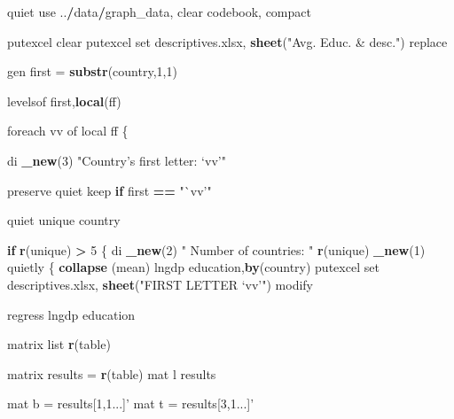 \documentclass[
  12pt,
]{article}
\newenvironment{Shaded}{\begin{snugshade}}{\end{snugshade}}
\newcommand{\ControlFlowTok}[1]{\textcolor[rgb]{0.13,0.29,0.53}{\textbf{#1}}}
\newcommand{\DecValTok}[1]{\textcolor[rgb]{0.00,0.00,0.81}{#1}}
\newcommand{\KeywordTok}[1]{\textcolor[rgb]{0.13,0.29,0.53}{\textbf{#1}}}
\newcommand{\NormalTok}[1]{#1}
\newcommand{\OperatorTok}[1]{\textcolor[rgb]{0.81,0.36,0.00}{\textbf{#1}}}
\newcommand{\StringTok}[1]{\textcolor[rgb]{0.31,0.60,0.02}{#1}}
\begin{document}
\begin{Shaded}
\begin{Highlighting}[]
{\NormalTok{quiet use ..}\OperatorTok{/}\NormalTok{data}\OperatorTok{/}\NormalTok{graph_data, clear}
\NormalTok{    codebook, compact}

\NormalTok{            putexcel clear}
\NormalTok{            putexcel set descriptives.xlsx, }\KeywordTok{sheet}\NormalTok{(}\StringTok{"Avg. Educ. & desc."}\NormalTok{) replace}
            

\NormalTok{gen first =}\StringTok{ }\KeywordTok{substr}\NormalTok{(country,}\DecValTok{1}\NormalTok{,}\DecValTok{1}\NormalTok{)}

\NormalTok{    levelsof first,}\KeywordTok{local}\NormalTok{(ff)}
    
\NormalTok{    foreach vv of local ff \{}
    
\NormalTok{        di }\KeywordTok{_new}\NormalTok{(}\DecValTok{3}\NormalTok{) }\StringTok{"Country's first letter: `vv'"}
        
\NormalTok{        preserve}
\NormalTok{        quiet keep }\ControlFlowTok{if}\NormalTok{ first }\OperatorTok{==}\StringTok{ "`vv'"}
        
\NormalTok{        quiet unique country}
            
            \ControlFlowTok{if} \KeywordTok{r}\NormalTok{(unique) }\OperatorTok{>}\StringTok{ }\DecValTok{5}\NormalTok{ \{}
\NormalTok{            di }\KeywordTok{_new}\NormalTok{(}\DecValTok{2}\NormalTok{) }\StringTok{"    Number of countries:    "} \KeywordTok{r}\NormalTok{(unique) }\KeywordTok{_new}\NormalTok{(}\DecValTok{1}\NormalTok{)}
\NormalTok{            quietly \{}
                \KeywordTok{collapse}\NormalTok{ (mean) lngdp education,}\KeywordTok{by}\NormalTok{(country)}
\NormalTok{                    putexcel set descriptives.xlsx, }\KeywordTok{sheet}\NormalTok{(}\StringTok{"FIRST LETTER `vv'"}\NormalTok{) modify}
                    
\NormalTok{                    regress lngdp education}
                        
\NormalTok{                            matrix list }\KeywordTok{r}\NormalTok{(table)}
                        
\NormalTok{                        matrix results =}\StringTok{ }\KeywordTok{r}\NormalTok{(table)}
\NormalTok{                            mat l results}
                        
\NormalTok{                        mat b =}\StringTok{ }\NormalTok{results[}\DecValTok{1}\NormalTok{,}\DecValTok{1}\NormalTok{...]}\StringTok{'}
\StringTok{                        mat t = results[3,1...]'}
                        
}
\end{Highlighting}
\end{Shaded}
\end{document}
